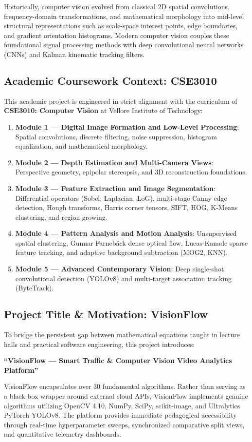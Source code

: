 \documentclass[12pt,a4paper]{article}
\begin{document}
Historically, computer vision evolved from classical 2D spatial convolutions, frequency-domain transformations, and mathematical morphology into mid-level structural representations such as scale-space interest points, edge boundaries, and gradient orientation histograms. Modern computer vision couples these foundational signal processing methods with deep convolutional neural networks (CNNs) and Kalman kinematic tracking filters.

\subsection{Academic Coursework Context: CSE3010}
This academic project is engineered in strict alignment with the curriculum of \textbf{CSE3010: Computer Vision} at Vellore Institute of Technology:
\begin{enumerate}
    \item \textbf{Module 1 — Digital Image Formation and Low-Level Processing}: Spatial convolutions, discrete filtering, noise suppression, histogram equalization, and mathematical morphology.
    \item \textbf{Module 2 — Depth Estimation and Multi-Camera Views}: Perspective geometry, epipolar stereopsis, and 3D reconstruction foundations.
    \item \textbf{Module 3 — Feature Extraction and Image Segmentation}: Differential operators (Sobel, Laplacian, LoG), multi-stage Canny edge detection, Hough transforms, Harris corner tensors, SIFT, HOG, K-Means clustering, and region growing.
    \item \textbf{Module 4 — Pattern Analysis and Motion Analysis}: Unsupervised spatial clustering, Gunnar Farneb\"ack dense optical flow, Lucas-Kanade sparse feature tracking, and adaptive background subtraction (MOG2, KNN).
    \item \textbf{Module 5 — Advanced Contemporary Vision}: Deep single-shot convolutional detection (YOLOv8) and multi-target association tracking (ByteTrack).
\end{enumerate}

\subsection{Project Title \& Motivation: VisionFlow}
To bridge the persistent gap between mathematical equations taught in lecture halls and practical software engineering, this project introduces:
\begin{center}
    \textbf{``VisionFlow — Smart Traffic \& Computer Vision Video Analytics Platform''}
\end{center}
VisionFlow encapsulates over 30 fundamental algorithms. Rather than serving as a black-box wrapper around external cloud APIs, VisionFlow implements genuine algorithms utilizing OpenCV 4.10, NumPy, SciPy, scikit-image, and Ultralytics PyTorch YOLOv8. The platform provides immediate pedagogical accessibility through real-time hyperparameter sweeps, synchronized comparative split views, and quantitative telemetry dashboards.
\end{document}
